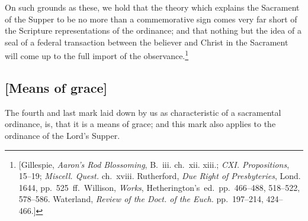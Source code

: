 \documentclass[
  english,
]{book}
\begin{document}
On such grounds as these, we hold that the theory which explains the Sacrament of the Supper to be no more than a commemorative sign comes very far short of the Scripture representations of the ordinance; and that nothing but the idea of a seal of a federal transaction between the believer and Christ in the Sacrament will come up to the full import of the observance.\footnote{{[}Gillespie, \emph{Aaron's Rod Blossoming}, B.~iii. ch.~xii. xiii.; \emph{CXI. Propositions}, 15--19; \emph{Miscell. Quest.} ch.~xviii. Rutherford, \emph{Due Right of Presbyteries}, Lond. 1644, pp.~525~ff.~Willison, \emph{Works}, Hetherington's~ed.~pp.~466--488, 518--522, 578--586. Waterland, \emph{Review of the Doct. of the Euch.} pp.~197--214, 424--466.{]}}

\hypertarget{means-of-grace-2}{%
\subsection{{[}Means of grace{]}}\label{means-of-grace-2}}

The fourth and last mark laid down by us as characteristic of a sacramental ordinance, is, that it is a means of grace; and this mark also applies to the ordinance of the Lord's Supper.
\end{document}

